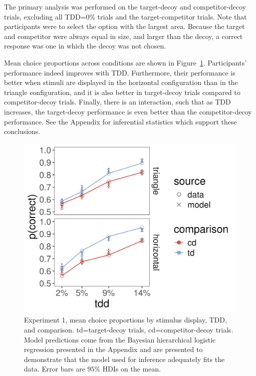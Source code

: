 The primary analysis was performed on the target-decoy and competitor-decoy trials, excluding all TDD=$0\%$ trials and the target-competitor trials. Note that participants were to select the option with the largest area. Because the target and competitor were always equal in size, and larger than the decoy, a correct response was one in which the decoy was not chosen. 

Mean choice proportions across conditions are shown in Figure~\ref{fig:e1_data}. Participants' performance indeed improves with TDD. Furthermore, their performance is better when stimuli are displayed in the horizontal configuration than in the triangle configuration, and it is also better in target-decoy trials compared to competitor-decoy trials. Finally, there is an interaction, such that as TDD increases, the target-decoy performance is even better than the competitor-decoy performance. See the Appendix for inferential statistics which support these conclusions.

\begin{figure}
   \includegraphics[width=\textwidth]{figures/m14_model_preds_v_data.jpeg}
   \caption{Experiment 1, mean choice proportions by stimulus display, TDD, and comparison. td=target-decoy trials, cd=competitor-decoy trials. Model predictions come from the Bayesian hierarchical logistic regression presented in the Appendix and are presented to demonstrate that the model used for inference adequately fits the data. Error bars are $95\%$ HDIs on the mean.}
   \label{fig:e1_data}
\end{figure}

